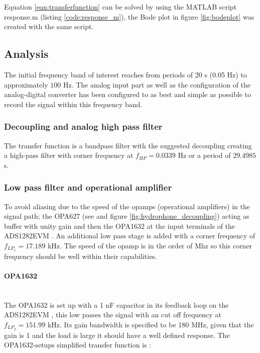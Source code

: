 \documentclass[a4paper]{article}
\begin{document}
Equation \ref{eqn:transferfunction} can be solved by using the MATLAB
script response.m (listing \ref{code:response_m}), the Bode plot in figure \ref{fig:bodeplot} was created with the same script.

\subsection{Analysis}
The initial frequency band of interest reaches
from periods of 20 s (0.05 Hz) to approximately $100$ Hz. The analog input part as
well as the configuration of the analog-digital converter has been
configured to as best and simple as possible to record the signal
within this frequency band.

\subsubsection{Decoupling and analog high pass filter}
The transfer function is a bandpass filter with
the suggested decoupling creating a high-pass filter with corner
frequency at $f_{HP} = 0.0339$ Hz or a period of $29.4985$ s.

\subsubsection{Low pass filter and operational amplifier}

To avoid aliasing due to the speed of the opamps (operational
amplifiers) in the signal path; the OPA627 (see \cite{opa627_ds} and
figure \ref{fig:hydrophone_decoupling}) acting as buffer with
unity gain and then the OPA1632 \cite{opa1632_ds} at the input terminals
of the ADS1282EVM \cite{ads1282evm_ds}.
An additional low pass stage is added with a corner frequency of
$f_{LP_1} = 17.189 $ kHz. The speed of the opamp is in the order of Mhz
so this corner frequency should be well within their capabilities.

\paragraph{OPA1632} \ \\
The OPA1632 \cite{opa1632_ds} is set up with a 1 nF capacitor in its
feedback loop on the ADS1282EVM \cite{ads1282evm_ds}, this low passes
the signal with an cut off frequency at $f_{LP_2} = 151.99$ kHz. Its
gain bandwidth is specified to be 180 MHz, given that the gain is 1 and
the load is large it should have a well defined response. The
OPA1632-setups simplified transfer function is \cite{fully_diff_opamps}:
\end{document}
